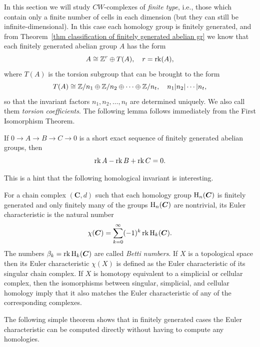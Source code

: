 In this section we will study $CW$-complexes of \emph{finite type}, i.e., those which contain only a finite number of cells in each dimension (but they can still be infinite-dimensional). In this case each homology group is finitely generated, and from Theorem~\ref{thm classification of finitely generated abelian gr} we know that each finitely generated abelian group $A$ has the form
\[A\cong \mathbb{Z}^r\oplus T(A),\quad r=\operatorname{rk}(A),\]
where $T(A)$ is the torsion subgroup that can be brought to the form
\[T(A)\cong \mathbb{Z}/n_1\oplus \mathbb{Z}/n_2\oplus \cdots \oplus \mathbb{Z}/n_t,\quad n_1|n_2|\cdots |n_t,\]
so that the invariant factors $n_1,n_2,\ldots,n_t$ are determined uniquely. We also call them \emph{torsion coefficients}. The following lemma follows immediately from the First Isomorphism Theorem.

\begin{lem}
    If $0\to A\to B\to C\to 0$ is a short exact sequence of finitely generated abelian groups, then
    \[\operatorname{rk} A-\operatorname{rk} B+\operatorname{rk} C=0.\]
\end{lem}

This is a hint that the following homological invariant is interesting.

\begin{defn}
    For a chain complex $(\bm{C},d)$ such that each homology group $\mathrm{H}_n(\boldsymbol{C})$ is finitely generated and only finitely many of the groups $\mathrm{H}_n(\boldsymbol{C})$ are nontrivial, its Euler characteristic is the natural number
    \[\chi(\boldsymbol{C})=\sum_{k=0}^\infty (-1)^k \operatorname{rk} \mathrm{H}_k(\boldsymbol{C}).\]
    The numbers $\beta_k=\operatorname{rk} \mathrm{H}_k(\boldsymbol{C})$ are called \emph{Betti numbers}.
    If $X$ is a topological space then its Euler characteristic $\chi(X)$ is defined as the Euler characteristic of its singular chain complex. If $X$ is homotopy equivalent to a simplicial or cellular complex, then the isomorphisms between singular, simplicial, and cellular homology imply that it also matches the Euler characteristic of any of the corresponding complexes.
\end{defn}

The following simple theorem shows that in finitely generated cases the Euler characteristic can be computed directly without having to compute any homologies.

